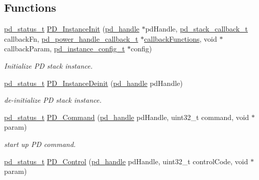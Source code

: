 \subsection*{Functions}
\begin{DoxyCompactItemize}
\item 
\hyperlink{group__usb__pd__stack_ga04a1f331d9807a70ab9bb753f5ed1c80}{pd\-\_\-status\-\_\-t} \hyperlink{group__usb__pd__stack_ga3ab001290dc934fd6a45ad93916f5140}{P\-D\-\_\-\-Instance\-Init} (\hyperlink{group__usb__pd__stack_ga9397835347d48ef48b6b0ecba6312213}{pd\-\_\-handle} $\ast$pd\-Handle, \hyperlink{group__usb__pd__stack_ga270b6a571db4fa308a1cce3df32f5439}{pd\-\_\-stack\-\_\-callback\-\_\-t} callback\-Fn, \hyperlink{group__usb__pd__stack_gaf1142461de7d7dcc6268c286ba956265}{pd\-\_\-power\-\_\-handle\-\_\-callback\-\_\-t} $\ast$\hyperlink{source__charger_2pd__app_8c_a306f9b8029582dfb8c64f163fea3cf65}{callback\-Functions}, void $\ast$callback\-Param, \hyperlink{group__usb__pd__stack_gafa6034f9e204836697da1f2fc996cbad}{pd\-\_\-instance\-\_\-config\-\_\-t} $\ast$config)
\begin{DoxyCompactList}\small\item\em Initialize P\-D stack instance. \end{DoxyCompactList}\item 
\hyperlink{group__usb__pd__stack_ga04a1f331d9807a70ab9bb753f5ed1c80}{pd\-\_\-status\-\_\-t} \hyperlink{group__usb__pd__stack_ga2a517af9491514966ad9c806eb998f78}{P\-D\-\_\-\-Instance\-Deinit} (\hyperlink{group__usb__pd__stack_ga9397835347d48ef48b6b0ecba6312213}{pd\-\_\-handle} pd\-Handle)
\begin{DoxyCompactList}\small\item\em de-\/initialize P\-D stack instance. \end{DoxyCompactList}\item 
\hyperlink{group__usb__pd__stack_ga04a1f331d9807a70ab9bb753f5ed1c80}{pd\-\_\-status\-\_\-t} \hyperlink{group__usb__pd__stack_gaa61d0ac40ef36db1ef5a88532f6eea90}{P\-D\-\_\-\-Command} (\hyperlink{group__usb__pd__stack_ga9397835347d48ef48b6b0ecba6312213}{pd\-\_\-handle} pd\-Handle, uint32\-\_\-t command, void $\ast$param)
\begin{DoxyCompactList}\small\item\em start up P\-D command. \end{DoxyCompactList}\item 
\hyperlink{group__usb__pd__stack_ga04a1f331d9807a70ab9bb753f5ed1c80}{pd\-\_\-status\-\_\-t} \hyperlink{group__usb__pd__stack_gac3d77e334213f541028d2da518086ca2}{P\-D\-\_\-\-Control} (\hyperlink{group__usb__pd__stack_ga9397835347d48ef48b6b0ecba6312213}{pd\-\_\-handle} pd\-Handle, uint32\-\_\-t control\-Code, void $\ast$param)

\end{DoxyCompactItemize}
